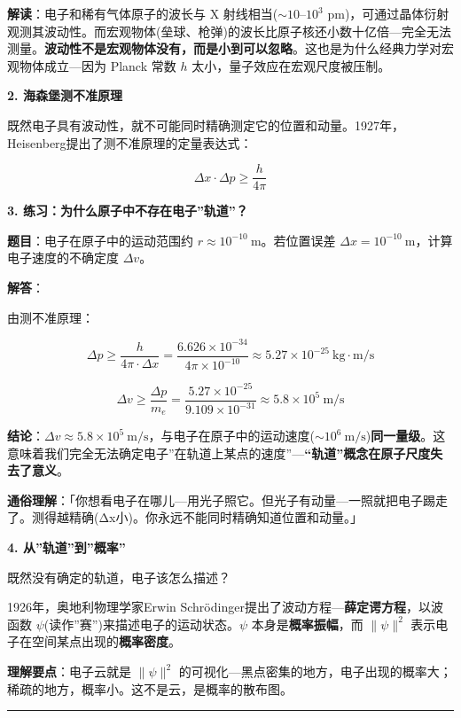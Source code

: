 \documentclass[a4paper,11pt]{ctexart}
\newcommand{\箭}{\ensuremath{\rightarrow}}
\newcommand{\左箭}{\ensuremath{\leftarrow}}
\newcommand{\上箭}{\ensuremath{\uparrow}}
\newcommand{\下箭}{\ensuremath{\downarrow}}
\newcommand{\衡}{\ensuremath{\rightleftharpoons}}
\newcommand{\双箭}{\ensuremath{\leftrightarrow}}
\newcommand{\约等于}{\ensuremath{\approx}}
\newcommand{\小于等于}{\ensuremath{\leq}}
\newcommand{\大于等于}{\ensuremath{\geq}}
\newcommand{\不等于}{\ensuremath{\neq}}
\newcommand{\西格马}{\ensuremath{\sigma}}
\newcommand{\派}{\ensuremath{\pi}}
\begin{document}
\textbf{解读}：电子和稀有气体原子的波长与 X 射线相当(\(\sim 10\text{–}10^3\) pm)，可通过晶体衍射观测其波动性。而宏观物体(垒球、枪弹)的波长比原子核还小数十亿倍---完全无法测量。\textbf{波动性不是宏观物体没有，而是小到可以忽略}。这也是为什么经典力学对宏观物体成立---因为 Planck 常数 \(h\) 太小，量子效应在宏观尺度被压制。

\textbf{2. 海森堡测不准原理}

既然电子具有波动性，就不可能同时精确测定它的位置和动量。1927年，Heisenberg提出了测不准原理的定量表达式：

\[
\boxed{\Delta x \cdot \Delta p \geq \frac{h}{4\pi}}
\]

\textbf{3. 练习：为什么原子中不存在电子''轨道''？}

\textbf{题目}：电子在原子中的运动范围约 \(r \approx 10^{-10}\ \mathrm{m}\)。若位置误差 \(\Delta x = 10^{-10}\ \mathrm{m}\)，计算电子速度的不确定度 \(\Delta v\)。

\textbf{解答}：

由测不准原理：

\[\Delta p \geq \frac{h}{4\pi \cdot \Delta x} = \frac{6.626\times 10^{-34}}{4\pi \times 10^{-10}} \approx 5.27\times 10^{-25}\ \mathrm{kg\cdot m/s}\]

\[\Delta v \geq \frac{\Delta p}{m_e} = \frac{5.27\times 10^{-25}}{9.109\times 10^{-31}} \approx 5.8\times 10^5\ \mathrm{m/s}\]

\textbf{结论}：\(\Delta v \approx 5.8\times 10^5\ \mathrm{m/s}\)，与电子在原子中的运动速度(\(\sim 10^6\ \mathrm{m/s}\))\textbf{同一量级}。这意味着我们完全无法确定电子''在轨道上某点的速度''---\textbf{``轨道''概念在原子尺度失去了意义}。

\textbf{通俗理解}：「你想看电子在哪儿---用光子照它。但光子有动量---一照就把电子踢走了。测得越精确(Δx小)。你永远不能同时精确知道位置和动量。」

\textbf{4. 从''轨道''到''概率''}

既然没有确定的轨道，电子该怎么描述？

1926年，奥地利物理学家Erwin Schrödinger提出了波动方程---\textbf{薛定谔方程}，以波函数 \(\psi\)(读作''赛'')来描述电子的运动状态。\(\psi\) 本身是\textbf{概率振幅}，而 \(\|\psi\|^2\) 表示电子在空间某点出现的\textbf{概率密度}。

\textbf{理解要点}：电子云就是 \(\|\psi\|^2\) 的可视化---黑点密集的地方，电子出现的概率大；稀疏的地方，概率小。这不是云，是概率的散布图。

\begin{center}\rule{0.5\linewidth}{0.5pt}\end{center}
\end{document}
